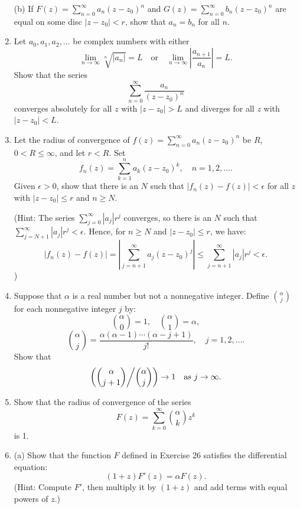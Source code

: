 \documentclass[12pt]{article}
\theoremstyle{definition} %
\theoremstyle{plain} %
\begin{document}
\begin{enumerate}
    (b) If $F(z) = \sum_{n=0}^\infty a_n (z - z_0)^n$ and $G(z) = \sum_{n=0}^\infty b_n (z - z_0)^n$ are equal on some disc $|z - z_0| < r$, show that $a_n = b_n$ for all $n$.
    
    \item Let $a_0, a_1, a_2, \dots$ be complex numbers with either
    \[
    \lim_{n \to \infty} \sqrt[n]{|a_n|} = L \quad \text{or} \quad \lim_{n \to \infty} \left| \frac{a_{n+1}}{a_n} \right| = L.
    \]
    Show that the series 
    \[
    \sum_{n=0}^\infty \frac{a_n}{(z - z_0)^n}
    \]
    converges absolutely for all $z$ with $|z - z_0| > L$ and diverges for all $z$ with $|z - z_0| < L$.
    
    \item Let the radius of convergence of $f(z) = \sum_{n=0}^\infty a_n (z - z_0)^n$ be $R$, $0 < R \le \infty$, and let $r < R$. Set
    \[
    f_n(z) = \sum_{k=1}^n a_k (z - z_0)^k, \quad n = 1, 2, \ldots.
    \]
    Given $\epsilon > 0$, show that there is an $N$ such that $|f_n(z) - f(z)| < \epsilon$ for all $z$ with $|z - z_0| \le r$ and $n \ge N$.
    
    (Hint: The series $\sum_{j=0}^\infty |a_j| r^j$ converges, so there is an $N$ such that $\sum_{j=N+1}^\infty |a_j| r^j < \epsilon$. Hence, for $n \ge N$ and $|z - z_0| \le r$, we have:
    \[
    |f_n(z) - f(z)| = \left| \sum_{j=n+1}^\infty a_j (z - z_0)^j \right| \le \sum_{j=n+1}^\infty |a_j| r^j < \epsilon.
    \])
    
    \item Suppose that $\alpha$ is a real number but not a nonnegative integer. Define $\binom{\alpha}{j}$ for each nonnegative integer $j$ by:
    \[
    \binom{\alpha}{0} = 1, \quad \binom{\alpha}{1} = \alpha,
    \]
    \[
    \binom{\alpha}{j} = \frac{\alpha(\alpha - 1) \cdots (\alpha - j + 1)}{j!}, \quad j = 1, 2, \ldots.
    \]
    Show that 
    \[
    \left( \binom{\alpha}{j+1} \middle/ \binom{\alpha}{j} \right) \to 1 \quad \text{as } j \to \infty.
    \]
    
    \item Show that the radius of convergence of the series
    \[
    F(z) = \sum_{k=0}^\infty \binom{\alpha}{k} z^k
    \]
    is 1.
    
    \item (a) Show that the function $F$ defined in Exercise 26 satisfies the differential equation:
    \[
    (1 + z) F'(z) = \alpha F(z).
    \]
    (Hint: Compute $F'$, then multiply it by $(1 + z)$ and add terms with equal powers of $z$.)
    

\end{enumerate}
\end{document}
